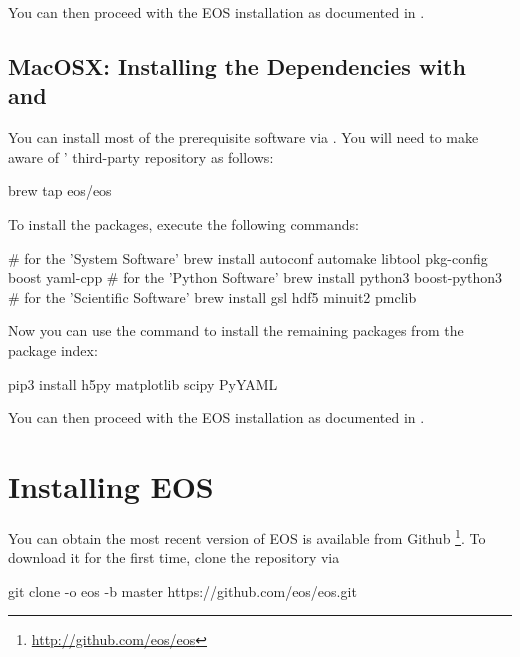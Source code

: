 You can then proceed with the EOS installation as documented in .

\subsection{MacOSX: Installing the Dependencies with  and }

You can install most of the prerequisite software via .
You will need to make  aware of \EOS'
third-party repository as follows:
\begin{commandline}
brew tap eos/eos
\end{commandline}

To install the packages, execute the following commands:
\begin{commandline}
# for the 'System Software'
brew install autoconf automake libtool pkg-config boost yaml-cpp
# for the 'Python Software'
brew install python3 boost-python3
# for the 'Scientific Software'
brew install gsl hdf5 minuit2 pmclib
\end{commandline}

Now you can use the  command to install the remaining
packages from the  package index:
\begin{commandline}
pip3 install h5py matplotlib scipy PyYAML
\end{commandline}


You can then proceed with the EOS installation as documented in .

\section{Installing EOS}
\label{sec:inst:EOS}

You can obtain the most recent version of EOS is available from Github
\footnote{\url{http://github.com/eos/eos}}.  To download it for the first time,
clone the repository via
%
\begin{commandline}
git clone -o eos -b master https://github.com/eos/eos.git
\end{commandline}

